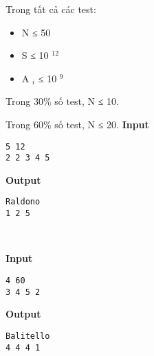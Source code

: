 Trong tất cả các test:
\begin{itemize}
	\item N ≤ 50
	\item S ≤ 10 $^ 12 $
	\item A $_ i $ ≤ 10 $^ 9 $
\end{itemize}

Trong 30\% số test, N ≤ 10.

Trong 60\% số test, N ≤ 20.
\textbf{Input }
\begin{verbatim}
5 12
2 2 3 4 5\end{verbatim}

\textbf{Output }
\begin{verbatim}
Raldono
1 2 5\end{verbatim}

 

\textbf{Input }
\begin{verbatim}
4 60
3 4 5 2\end{verbatim}

\textbf{Output }
\begin{verbatim}
Balitello
4 4 4 1\end{verbatim}